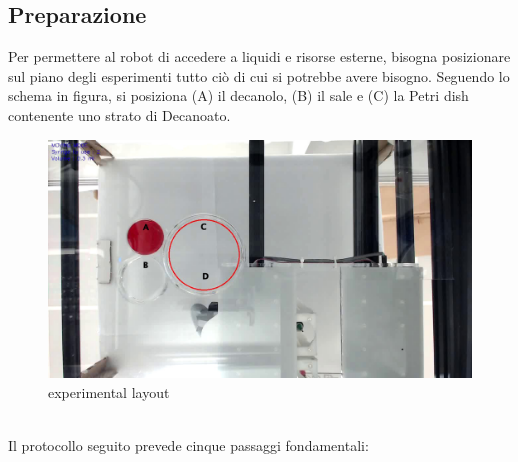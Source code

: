 \subsection{Preparazione}
Per permettere al robot di accedere a liquidi e risorse esterne, bisogna posizionare sul piano degli esperimenti tutto ciò di cui si potrebbe avere bisogno. Seguendo lo schema in figura, si posiziona (A) il decanolo, (B) il sale e (C) la Petri dish contenente uno strato di Decanoato.
\begin{figure}[h]
	  \includegraphics[scale=0.30]{immagini/exp1.jpg}
		\centering
	 \caption{experimental layout}
	\end{figure} 
\\Il protocollo seguito prevede cinque passaggi fondamentali: 
